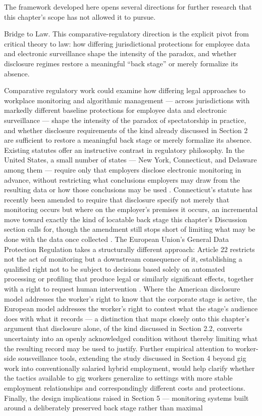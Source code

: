 \documentclass[10pt]{article}
\begin{document}
The framework developed here opens several directions for further research that this chapter's scope has not allowed it to pursue.

\begin{callout}{Bridge to Law.}
This comparative-regulatory direction is the explicit pivot from critical theory to law: how differing jurisdictional protections for employee data and electronic surveillance shape the intensity of the paradox, and whether disclosure regimes restore a meaningful ``back stage'' or merely formalize its absence.
\end{callout}

Comparative regulatory work could examine how differing legal approaches to workplace monitoring and algorithmic management --- across jurisdictions with markedly different baseline protections for employee data and electronic surveillance --- shape the intensity of the paradox of spectatorship in practice, and whether disclosure requirements of the kind already discussed in Section 2 are sufficient to restore a meaningful back stage or merely formalize its absence. Existing statutes offer an instructive contrast in regulatory philosophy. In the United States, a small number of states --- New York, Connecticut, and Delaware among them --- require only that employers disclose electronic monitoring in advance, without restricting what conclusions employers may draw from the resulting data or how those conclusions may be used \cite{nystate,ctstate}. Connecticut's statute has recently been amended to require that disclosure specify not merely that monitoring occurs but where on the employer's premises it occurs, an incremental move toward exactly the kind of locatable back stage this chapter's Discussion section calls for, though the amendment still stops short of limiting what may be done with the data once collected \cite{ctstate}. The European Union's General Data Protection Regulation takes a structurally different approach: Article 22 restricts not the act of monitoring but a downstream consequence of it, establishing a qualified right not to be subject to decisions based solely on automated processing or profiling that produce legal or similarly significant effects, together with a right to request human intervention \cite{eu}. Where the American disclosure model addresses the worker's right to know that the corporate stage is active, the European model addresses the worker's right to contest what the stage's audience does with what it records --- a distinction that maps closely onto this chapter's argument that disclosure alone, of the kind discussed in Section 2.2, converts uncertainty into an openly acknowledged condition without thereby limiting what the resulting record may be used to justify. Further empirical attention to worker-side sousveillance tools, extending the study discussed in Section 4 beyond gig work into conventionally salaried hybrid employment, would help clarify whether the tactics available to gig workers generalize to settings with more stable employment relationships and correspondingly different costs and protections. Finally, the design implications raised in Section 5 --- monitoring systems built around a deliberately preserved back stage rather than maximal 
\end{document}
